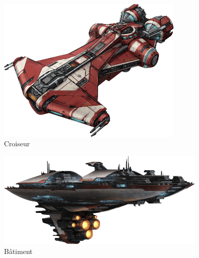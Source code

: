 \onecolumn
\begin{figure}
  \caption{Croiseur}
  \centering
  \includegraphics[width=0.8\textwidth]{img/equipement/croiseur.png}
\end{figure}
\begin{figure}
  \caption{Bâtiment}
  \centering
  \includegraphics[width=0.9\textwidth]{img/equipement/batiment.png}
\end{figure}
\twocolumn